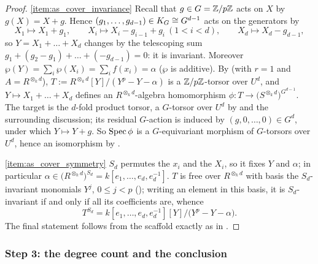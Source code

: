 \begin{proof}
    \ref{item:as_cover_invariance}
    Recall that $g \in G = \mathbb{Z}/p\mathbb{Z}$ acts on $X$ by $g(X) = X + g$. Hence
    $(g_1, \dots, g_{d-1}) \in K_{G} \cong G^{d-1}$ acts on the generators by
    \[
        X_1 \mapsto X_1 + g_1, \qquad
        X_i \mapsto X_i - g_{i-1} + g_i \ (1 < i < d), \qquad
        X_d \mapsto X_d - g_{d-1},
    \]
    so $Y = X_1 + \dots + X_d$ changes by the telescoping sum
    $g_1 + (g_2 - g_1) + \dots + (-g_{d-1}) = 0$: it is invariant. Moreover
    $\wp(Y) = \sum_i \wp(X_i) = \sum_i f(x_i) = \alpha$ ($\wp$ is additive).
    By  (with $r = 1$ and $A = R^{\otimes_k d}$),
    $T := R^{\otimes_k d}[Y]/(Y^p - Y - \alpha)$ is a $\mathbb{Z}/p\mathbb{Z}$-torsor over $U^d$,
    and $Y \mapsto X_1 + \dots + X_d$ defines an $R^{\otimes_k d}$-algebra
    homomorphism $\phi : T \to \bigl(S^{\otimes_k d}\bigr)^{G^{d-1}}$. The target
    is the $d$-fold product torsor, a $G$-torsor over $U^d$ by
     and the surrounding discussion; its
    residual $G$-action is induced by $(g, 0, \dots, 0) \in G^d$, under which
    $Y \mapsto Y + g$. So $\operatorname{Spec} \phi$ is a $G$-equivariant morphism of
    $G$-torsors over $U^d$, hence an isomorphism by
    .

    \ref{item:as_cover_symmetry} $S_d$ permutes the $x_i$ and the $X_i$, so it
    fixes $Y$ and $\alpha$; in particular
    $\alpha \in \bigl(R^{\otimes_k d}\bigr)^{S_d} = k[e_1, \dots, e_d, e_d^{-1}]$.
    $T$ is free over $R^{\otimes_k d}$ with basis the $S_d$-invariant monomials
    $Y^j$, $0 \leq j < p$ (); writing an element in
    this basis, it is $S_d$-invariant if and only if all its coefficients are,
    whence
    \[
        T^{S_d}
        = k[e_1, \dots, e_d, e_d^{-1}][Y]\big/\bigl(Y^p - Y - \alpha\bigr).
    \]
    The final statement follows from the scaffold exactly as in
    .
\end{proof}

\subsubsection*{Step 3: the degree count and the conclusion}

